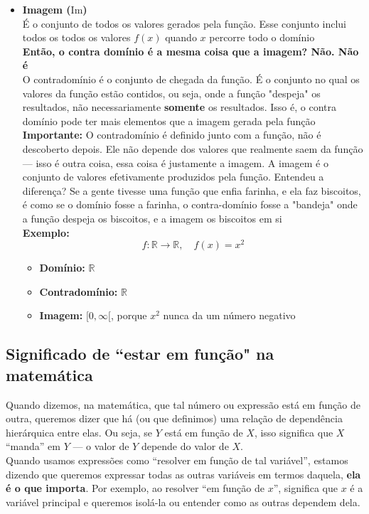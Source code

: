 \documentclass{article}
\begin{document}
\begin{itemize}
    \item \textbf{Imagem ($\mathrm{Im}$)}
    \\[5pt]
    É o conjunto de todos os valores gerados pela função. Esse conjunto inclui todos os todos os valores $f(x)$ quando $x$ percorre todo o domínio
    \\[5pt]
    \textbf{Então, o contra domínio é a mesma coisa que a imagem? Não. Não é}
    \\[5pt]
    O contradomínio é o conjunto de chegada da função. É o conjunto no qual os valores da função estão contidos, ou seja, onde a função "despeja" os resultados, não necessariamente \textbf{somente} os resultados. Isso é, o contra domínio pode ter mais elementos que a imagem gerada pela função \textbf{Importante:} O contradomínio é definido junto com a função, não é descoberto depois. Ele não depende dos valores que realmente saem da função — isso é outra coisa, essa coisa é justamente a imagem. A imagem é o conjunto de valores efetivamente produzidos pela função. Entendeu a diferença? Se a gente tivesse uma função que enfia farinha, e ela faz biscoitos, é como se o domínio fosse a farinha, o contra-domínio fosse a "bandeja" onde a função despeja os biscoitos, e a imagem os biscoitos em si
    \\[5pt]
    \textbf{Exemplo:}
    \[
    f: \mathbb{R} \to \mathbb{R}, \quad f(x) = x^2
    \]
    \begin{itemize}
        \item \textbf{Domínio:} $\mathbb{R}$
        \item \textbf{Contradomínio:} $\mathbb{R}$
        \item \textbf{Imagem:} $[0, \infty[$, porque $x^2$ nunca da um número negativo
    \end{itemize}
    \end{itemize}

\subsection{Significado de ``estar em função" na matemática}

Quando dizemos, na matemática, que tal número ou expressão está em função de outra, queremos dizer que há (ou que definimos) uma relação de dependência hierárquica entre elas. Ou seja, se $Y$ está em função de $X$, isso significa que $X$ ``manda'' em $Y$ — o valor de $Y$ depende do valor de $X$.
\\[5pt]
Quando usamos expressões como ``resolver em função de tal variável'', estamos dizendo que queremos expressar todas as outras variáveis em termos daquela, \textbf{ela é o que importa}. Por exemplo, ao resolver ``em função de $x$'', significa que $x$ é a variável principal e queremos isolá-la ou entender como as outras dependem dela.
\end{document}
